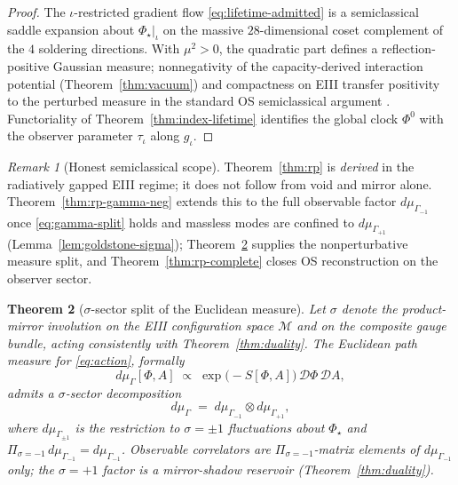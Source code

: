 \documentclass[11pt]{article}
\theoremstyle{plain}
\newtheorem{theorem}{Theorem}[section]
\theoremstyle{definition}
\theoremstyle{remark}
\newtheorem{remark}[theorem]{Remark}
\numberwithin{equation}{section}
\newcommand{\orderparam}{\Phi}
\begin{document}
\begin{proof}
The $\iota$-restricted gradient flow \eqref{eq:lifetime-admitted} is a
semiclassical saddle expansion about $\orderparam_\star|_\iota$ on the massive
$28$-dimensional coset complement of the $4$ soldering directions. With
$\mu^2>0$, the quadratic part defines a reflection-positive Gaussian measure;
nonnegativity of the capacity-derived interaction potential
(Theorem~\ref{thm:vacuum}) and compactness on EIII transfer positivity to the
perturbed measure in the standard OS semiclassical argument
\cite{GlimmJaffe1987,OsterwalderSchrader1973}. Functoriality of
Theorem~\ref{thm:index-lifetime} identifies the global clock
$\orderparam^0$ with the observer parameter $\tau_\iota$ along $g_\iota$.
\end{proof}

\begin{remark}[Honest semiclassical scope]
Theorem~\ref{thm:rp} is \emph{derived} in the radiatively gapped EIII regime;
it does not follow from void and mirror alone. Theorem~\ref{thm:rp-gamma-neg}
extends this to the full observable factor $d\mu_{\Gamma_{-1}}$ once
\eqref{eq:gamma-split} holds and massless modes are confined to
$d\mu_{\Gamma_{+1}}$ (Lemma~\ref{lem:goldstone-sigma}); Theorem~\ref{thm:sigma-measure}
supplies the nonperturbative measure split, and Theorem~\ref{thm:rp-complete}
closes OS reconstruction on the observer sector.
\end{remark}

\begin{theorem}[$\sigma$-sector split of the Euclidean measure]
\label{thm:sigma-measure}
Let $\sigma$ denote the product-mirror involution on the EIII configuration
space $\mathcal{M}$ and on the composite gauge bundle, acting consistently with
Theorem~\ref{thm:duality}. The Euclidean path measure for \eqref{eq:action},
formally
\begin{equation}\label{eq:gamma-full}
  d\mu_\Gamma[\orderparam,A]
  \;\propto\;
  \exp\!\bigl(-S[\orderparam,A]\bigr)\,\mathcal{D}\orderparam\,\mathcal{D}A,
\end{equation}
admits a $\sigma$-sector decomposition
\begin{equation}\label{eq:gamma-split}
  d\mu_\Gamma
  \;=\;
  d\mu_{\Gamma_{-1}}\otimes d\mu_{\Gamma_{+1}},
\end{equation}
where $d\mu_{\Gamma_{\pm1}}$ is the restriction to $\sigma=\pm1$
fluctuations about $\orderparam_\star$ and
$\Pi_{\sigma=-1}\,d\mu_{\Gamma_{-1}}=d\mu_{\Gamma_{-1}}$.
Observable correlators are $\Pi_{\sigma=-1}$-matrix elements of
$d\mu_{\Gamma_{-1}}$ only; the $\sigma=+1$ factor is a mirror-shadow
reservoir (Theorem~\ref{thm:duality}).
\end{theorem}
\end{document}
